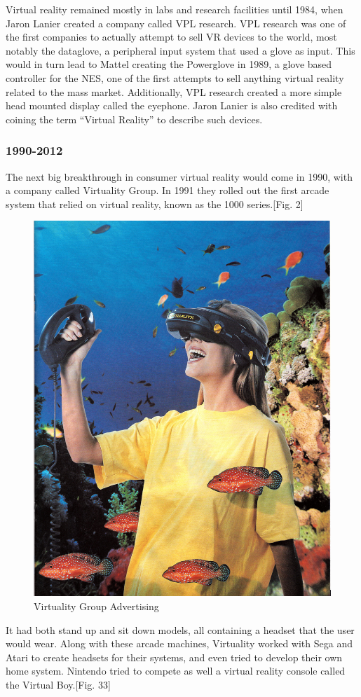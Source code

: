 \documentclass[a4paper,10pt]{article}
\begin{document}
	Virtual reality remained mostly in labs and research facilities until 1984, when Jaron Lanier created a company called VPL research.  VPL research was one of the first companies to actually attempt to sell VR devices to the world, most notably the dataglove, a peripheral input system that used a glove as input.  This would in turn lead to Mattel creating the Powerglove in 1989, a glove based controller for the NES, one of the first attempts to sell anything virtual reality related to the mass market.  Additionally, VPL research created a more simple head mounted display called the eyephone. Jaron Lanier is also credited with coining the term “Virtual Reality” to describe such devices.  
	\subsubsection{1990-2012}
	The next big breakthrough in consumer virtual reality would come in 1990, with a company called Virtuality Group.  In 1991 they rolled out the first arcade system that relied on virtual reality, known as the 1000 series.[Fig. 2]  
		\begin{figure}[H]
			\includegraphics[scale=0.5]{virtuality.jpg}
			\caption{Virtuality Group Advertising}
			\label{fig:virtuality}
		\end{figure}It had both stand up and sit down models, all containing a headset that the user would wear.  Along with these arcade machines, Virtuality worked with Sega and Atari to create headsets for their systems, and even tried to develop their own home system.  Nintendo tried to compete as well a virtual reality console called the Virtual Boy.[Fig. 33]
\end{document}
